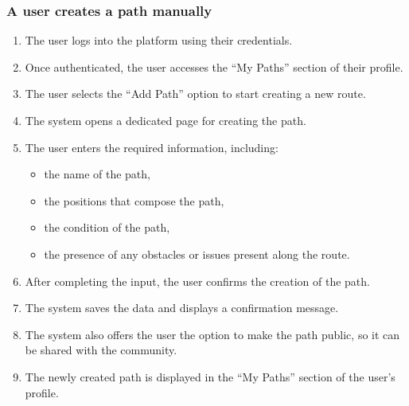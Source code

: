 \subsubsection*{A user creates a path manually}
\begin{enumerate}
    \item The user logs into the platform using their credentials.
    \item Once authenticated, the user accesses the “My Paths” section of their profile.
    \item The user selects the “Add Path” option to start creating a new route.
    \item The system opens a dedicated page for creating the path.
    \item The user enters the required information, including:
        \begin{itemize}
            \item the name of the path,
            \item the positions that compose the path,
            \item the condition of the path,
            \item the presence of any obstacles or issues present along the route.
        \end{itemize}
    \item After completing the input, the user confirms the creation of the path.
    \item The system saves the data and displays a confirmation message.
    \item The system also offers the user the option to make the path public, so it can be shared with the community.
    \item The newly created path is displayed in the “My Paths” section of the user’s profile.
\end{enumerate}
